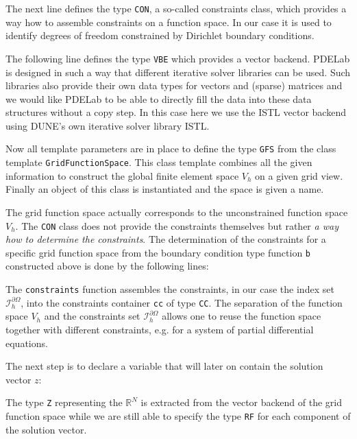 \documentclass[a4paper,12pt]{article}
\begin{document}
The next line defines the type \lstinline{CON}, a so-called constraints class,
which provides a way how to assemble constraints on a function space.
In our case it is used to identify degrees of freedom constrained by
Dirichlet boundary conditions.

The following line defines the type \lstinline{VBE} which provides a
vector backend. PDELab is designed in such a way that different iterative
solver libraries can be used. Such libraries also provide their own data types
for vectors and (sparse) matrices and we would like PDELab to be able to directly fill
the data into these data structures without a copy step. In this case here we use
the ISTL vector backend using DUNE's own iterative solver library ISTL.

Now all template parameters are in place to define the type \lstinline{GFS}
from the class template \lstinline{GridFunctionSpace}. This class template
combines all the given information to construct the global finite element
space $V_h$ on a given grid view. Finally an object of this class is
instantiated and the space is given a name.

The grid function space actually corresponds to the unconstrained
function space $V_h$. The \lstinline{CON} class does not provide
the constraints themselves but rather {\em a way how to determine the constraints}.
The determination of the constraints for a specific grid function space from the
boundary condition type function \lstinline{b} constructed above 
is done by the following lines:

The \lstinline{constraints} function assembles the constraints, in our case
the index set $\mathcal{I}_h^{\partial\Omega}$, into the constraints container
\lstinline{cc} of type \lstinline{CC}. The separation of the function space
$V_h$ and the constraints set $\mathcal{I}_h^{\partial\Omega}$ allows
one to reuse the function space together with different constraints, e.g.
for a system of partial differential equations.

The next step is to declare a variable that will later on contain
the solution vector $z$:

The type \lstinline{Z} representing the $\mathbb{R}^N$ is extracted from
the vector backend of the grid function space while we are still
able to specify the type \lstinline{RF} for each component of the 
solution vector.
\end{document}
